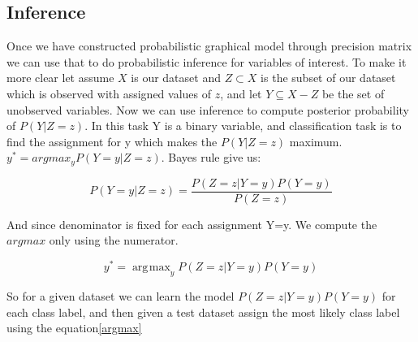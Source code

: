 \documentclass{article} %
\DeclareMathOperator*{\argmax}{\arg\!\max}
\begin{document}
\subsection{Inference}
Once we have constructed probabilistic graphical model through precision 
matrix we can use that to do probabilistic inference for variables of 
interest. To make it more clear let assume $X$ is our dataset and 
$Z \subset X$ is the subset of our dataset which is observed with 
assigned values of $z$, and let $Y \subseteq X - Z$ be the set of unobserved 
variables. Now we can use inference to compute posterior probability of 
$P(Y|Z=z)$. In this task Y is a binary variable, and classification task is 
to find the assignment for y which makes the $P(Y|Z=z)$ maximum. 
$y^* = argmax_{y} P(Y=y|Z=z)$. Bayes rule give us: 

\begin{equation}
P(Y=y|Z=z) = \frac{P(Z=z|Y=y)P(Y=y)}{P(Z=z)}
\end{equation}  

And since denominator is fixed for each assignment Y=y. We compute the $argmax$ only using the numerator. 

\begin{equation}\label{argmax}
y^* = \argmax_{y} P(Z=z|Y=y)P(Y=y) 
\end{equation} 

So for a given dataset we can learn the model $ P(Z=z|Y=y)P(Y=y)$ for each 
class label, and then given a test dataset assign the most likely class 
label using the equation\eqref{argmax} \cite{Rish2014Book}  

	
\end{document}

